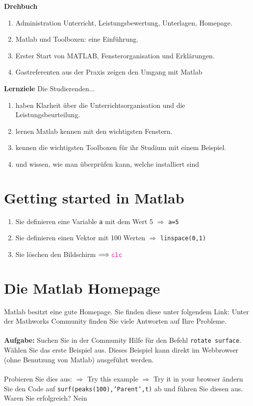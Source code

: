 \textbf{Drehbuch}
\begin{enumerate}[$\bullet$]
\item Administration Unterricht, Leistungsbewertung, Unterlagen, Homepage.
\item Matlab und Toolboxen: eine Einführung.
\item Erster Start von MATLAB, Fensterorganisation und Erklärungen.
\item Gastreferenten aus der Praxis zeigen den Umgang mit Matlab
\end{enumerate}
\textbf{Lernziele}
Die Studierenden...
\begin{enumerate}[$\bullet$]
\item haben Klarheit über die Unterrichtsorganisation und die Leistungsbeurteilung.
\item lernen Matlab kennen mit den wichtigsten Fenstern.
\item kennen die wichtigsten Toolboxen für ihr Studium mit einem Beispiel.
\item und wissen, wie man überprüfen kann, welche installiert sind
\end{enumerate}
\section{Getting started in Matlab}
\begin{enumerate}
\item Sie definieren eine Variable \texttt{a} mit dem Wert 5 $\Longrightarrow$ {\color{magenta}\texttt{a=5}}
\item Sie definieren einen Vektor mit 100 Werten $\Longrightarrow$ {\color{magenta}\texttt{linspace(0,1)}}
\item Sie löschen den Bildschirm $\Longrightarrow {\color{magenta}\texttt{clc}}$
\end{enumerate}
\section{Die Matlab Homepage}
Matlab besitzt eine gute Homepage. Sie finden diese unter folgendem Link:
Unter der Mathworks Community finden Sie viele Antworten auf Ihre Probleme.
\\\\
\textbf{Aufgabe:}
Suchen Sie in der Community Hilfe für den Befehl {\color{red}\texttt{rotate surface}}.
Wählen Sie das erste Beispiel aus.
Dieses Beispiel kann direkt im Webbrowser (ohne Benutzung von Matlab) ausgeführt werden.
\\\\
Probieren Sie dies aus:
$\Rightarrow$ Try this example $\Rightarrow$ Try it in your browser
ändern Sie den Code auf
{\color{red}\texttt{surf(peaks(100),'Parent',t)}}
ab und führen Sie diesen aus.
Waren Sie erfolgreich? Nein
